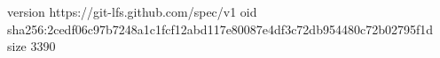 version https://git-lfs.github.com/spec/v1
oid sha256:2cedf06c97b7248a1c1fcf12abd117e80087e4df3c72db954480c72b02795f1d
size 3390
